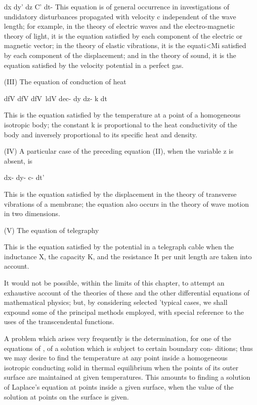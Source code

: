 dx dy' dz C' dt- This equation is of general occurrence in
investigations of undidatory disturbances propagated with velocity c
independent of the wave length; for example, in the theory of
electric waves and the electro-magnetic theory of light, it is the
equation satisfied by each component of the electric or magnetic
vector; in the theory of elastic vibrations, it is the equati<Mi
satisfied by each component of the displacement; and in the theory of
sound, it is the equation satisfied by the velocity potential in a
perfect gas.

%
%

(III) The equation of conduction of heat

dfV dfV dfV\ ldV dec- dy dz- k dt

This is the equation satisfied by the temperature at a point of a
homogeneous isotropic body; the constant k is proportional to the
heat conductivity of the body and inversely proportional to its
specific heat and density.

(IV) A particular case of the preceding equation (II), when the
variable z is absent, is

dx- dy- c- dt'

This is the equation satisfied by the displacement in the theory of
transverse vibrations of a membrane; the equation also occurs in the
theory of wave motion in two dimensions.

(V) The equation of telegraphy

This is the equation satisfied by the potential in a telegraph cable
when the inductance X, the capacity K, and the resistance It per unit
length are taken into account.

It would not be possible, within the limits of this chapter, to
attempt an exhaustive account of the theories of these and the other
differential equations of mathematical physics; but, by considering
selected 'typical cases, we shall expound some of the principal
methods employed, with special reference to the uses of the
transcendental functions.


A problem which arises very frequently is the determination, for one
of the equations of , of a solution which is subject to certain
boundary con- ditions; thus we may desire to find the temperature at
any point inside a homogeneous isotropic conducting solid in thermal
equilibrium when the points of its outer surface are maintained at
given temperatures. This amounts to finding a solution of Laplace's
equation at points inside a given surface, when the value of the
solution at points on the surface is given.

